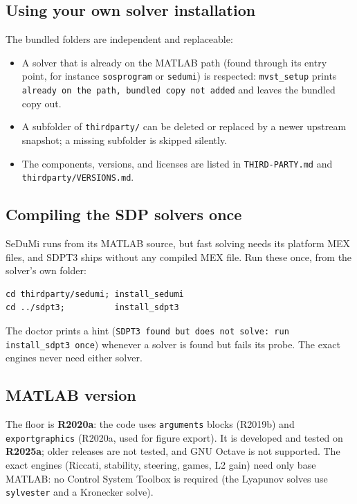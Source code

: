\documentclass[11pt,oneside]{report}
\newcommand{\code}[1]{\texttt{#1}}
\providecommand{\tightlist}{\setlength{\itemsep}{0pt}\setlength{\parskip}{0pt}}
\begin{document}
\hypertarget{using-your-own-solver-installation}{%
\subsection{Using your own solver installation}\label{using-your-own-solver-installation}}

The bundled folders are independent and replaceable:

\begin{itemize}
\tightlist
\item
  A solver that is already on the MATLAB path (found through its entry point,
  for instance \code{sosprogram} or \code{sedumi}) is respected: \code{mvst\_setup} prints
  \code{already on the path, bundled copy not added} and leaves the bundled copy out.
\item
  A subfolder of \code{thirdparty/} can be deleted or replaced by a newer upstream
  snapshot; a missing subfolder is skipped silently.
\item
  The components, versions, and licenses are listed in \code{THIRD-PARTY.md} and
  \code{thirdparty/VERSIONS.md}.
\end{itemize}

\hypertarget{compiling-the-sdp-solvers-once}{%
\subsection{Compiling the SDP solvers once}\label{compiling-the-sdp-solvers-once}}

SeDuMi runs from its MATLAB source, but fast solving needs its platform MEX
files, and SDPT3 ships without any compiled MEX file. Run these once, from the
solver's own folder:

\begin{lstlisting}[style=matlabstyle]
cd thirdparty/sedumi; install_sedumi
cd ../sdpt3;          install_sdpt3
\end{lstlisting}

The doctor prints a hint (\code{SDPT3 found but does not solve: run install\_sdpt3 once}) whenever a solver is found but fails its probe. The exact engines never
need either solver.

\hypertarget{matlab-version}{%
\subsection{MATLAB version}\label{matlab-version}}

The floor is \textbf{R2020a}: the code uses \code{arguments} blocks (R2019b) and
\code{exportgraphics} (R2020a, used for figure export). It is developed and tested on
\textbf{R2025a}; older releases are not tested, and GNU Octave is not supported. The
exact engines (Riccati, stability, steering, games, L2 gain) need only base
MATLAB: no Control System Toolbox is required (the Lyapunov solves use
\code{sylvester} and a Kronecker solve).
\end{document}
